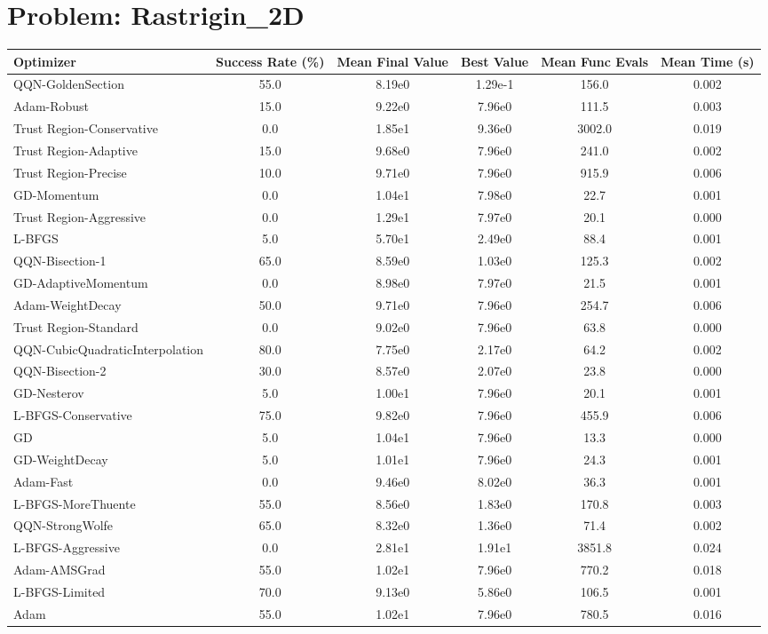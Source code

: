 \documentclass{article}
\begin{document}
\section{Problem: Rastrigin\_2D}
\begin{longtable}{p{3cm}*{5}{c}}
\toprule
\textbf{Optimizer} & \textbf{Success Rate (\%)} & \textbf{Mean Final Value} & \textbf{Best Value} & \textbf{Mean Func Evals} & \textbf{Mean Time (s)} \\
\midrule
QQN-GoldenSection & 55.0 & 8.19e0 & 1.29e-1 & 156.0 & 0.002 \\
Adam-Robust & 15.0 & 9.22e0 & 7.96e0 & 111.5 & 0.003 \\
Trust Region-Conservative & 0.0 & 1.85e1 & 9.36e0 & 3002.0 & 0.019 \\
Trust Region-Adaptive & 15.0 & 9.68e0 & 7.96e0 & 241.0 & 0.002 \\
Trust Region-Precise & 10.0 & 9.71e0 & 7.96e0 & 915.9 & 0.006 \\
GD-Momentum & 0.0 & 1.04e1 & 7.98e0 & 22.7 & 0.001 \\
Trust Region-Aggressive & 0.0 & 1.29e1 & 7.97e0 & 20.1 & 0.000 \\
L-BFGS & 5.0 & 5.70e1 & 2.49e0 & 88.4 & 0.001 \\
QQN-Bisection-1 & 65.0 & 8.59e0 & 1.03e0 & 125.3 & 0.002 \\
GD-AdaptiveMomentum & 0.0 & 8.98e0 & 7.97e0 & 21.5 & 0.001 \\
Adam-WeightDecay & 50.0 & 9.71e0 & 7.96e0 & 254.7 & 0.006 \\
Trust Region-Standard & 0.0 & 9.02e0 & 7.96e0 & 63.8 & 0.000 \\
QQN-CubicQuadraticInterpolation & 80.0 & 7.75e0 & 2.17e0 & 64.2 & 0.002 \\
QQN-Bisection-2 & 30.0 & 8.57e0 & 2.07e0 & 23.8 & 0.000 \\
GD-Nesterov & 5.0 & 1.00e1 & 7.96e0 & 20.1 & 0.001 \\
L-BFGS-Conservative & 75.0 & 9.82e0 & 7.96e0 & 455.9 & 0.006 \\
GD & 5.0 & 1.04e1 & 7.96e0 & 13.3 & 0.000 \\
GD-WeightDecay & 5.0 & 1.01e1 & 7.96e0 & 24.3 & 0.001 \\
Adam-Fast & 0.0 & 9.46e0 & 8.02e0 & 36.3 & 0.001 \\
L-BFGS-MoreThuente & 55.0 & 8.56e0 & 1.83e0 & 170.8 & 0.003 \\
QQN-StrongWolfe & 65.0 & 8.32e0 & 1.36e0 & 71.4 & 0.002 \\
L-BFGS-Aggressive & 0.0 & 2.81e1 & 1.91e1 & 3851.8 & 0.024 \\
Adam-AMSGrad & 55.0 & 1.02e1 & 7.96e0 & 770.2 & 0.018 \\
L-BFGS-Limited & 70.0 & 9.13e0 & 5.86e0 & 106.5 & 0.001 \\
Adam & 55.0 & 1.02e1 & 7.96e0 & 780.5 & 0.016 \\
\bottomrule
\end{longtable}
\end{document}
